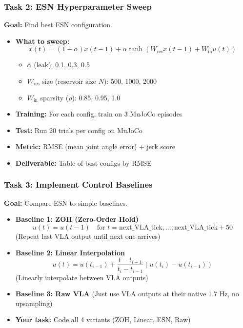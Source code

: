 \documentclass[11pt]{article}
\begin{document}
\subsubsection{Task 2: ESN Hyperparameter Sweep}
\textbf{Goal:} Find best ESN configuration.

\begin{itemize}
    \item \textbf{What to sweep:}
    \begin{equation}
    x(t) = (1-\alpha)x(t-1) + \alpha \tanh\left(W_{\text{res}}x(t-1) + W_{\text{in}}u(t)\right)
    \end{equation}
    \begin{itemize}
        \item $\alpha$ (leak): 0.1, 0.3, 0.5
        \item $W_{\text{res}}$ size (reservoir size $N$): 500, 1000, 2000
        \item $W_{\text{in}}$ sparsity ($\rho$): 0.85, 0.95, 1.0
    \end{itemize}
    \item \textbf{Training:} For each config, train on 3 MuJoCo episodes
    \item \textbf{Test:} Run 20 trials per config on MuJoCo
    \item \textbf{Metric:} RMSE (mean joint angle error) + jerk score
    \item \textbf{Deliverable:} Table of best configs by RMSE
\end{itemize}

\subsubsection{Task 3: Implement Control Baselines}
\textbf{Goal:} Compare ESN to simple baselines.

\begin{itemize}
    \item \textbf{Baseline 1: ZOH (Zero-Order Hold)}
    \begin{equation}
    u(t) = u(t-1) \quad \text{for } t = \text{next\_VLA\_tick}, \dots, \text{next\_VLA\_tick} + 50
    \end{equation}
    (Repeat last VLA output until next one arrives)
    
    \item \textbf{Baseline 2: Linear Interpolation}
    \begin{equation}
    u(t) = u(t_{i-1}) + \frac{t - t_{i-1}}{t_i - t_{i-1}} (u(t_i) - u(t_{i-1}))
    \end{equation}
    (Linearly interpolate between VLA outputs)
    
    \item \textbf{Baseline 3: Raw VLA}
    (Just use VLA outputs at their native 1.7 Hz, no upsampling)
    
    \item \textbf{Your task:} Code all 4 variants (ZOH, Linear, ESN, Raw)
\end{itemize}
\end{document}
